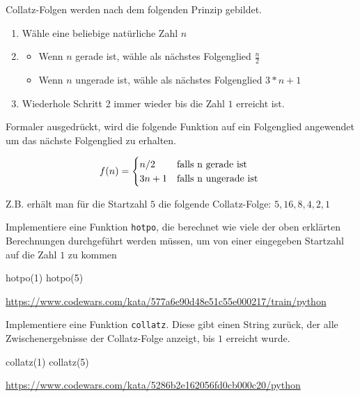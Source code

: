 \documentclass[class=scrartcl, crop=false]{standalone}
\begin{document}
\begin{aufgabe} \noindent
Collatz-Folgen werden nach dem folgenden Prinzip gebildet. 
\begin{enumerate}
	\item Wähle eine beliebige natürliche Zahl $n$
	\item  
		\begin{itemize}
		\item Wenn $n$ gerade ist, wähle als nächstes Folgenglied $\frac{n}{2}$
		\item Wenn $n$ ungerade ist, wähle als nächstes Folgenglied $3*n + 1$
		\end{itemize} 
	\item Wiederhole Schritt 2 immer wieder bis die Zahl $1$ erreicht ist.

\end{enumerate}

Formaler ausgedrückt, wird die folgende Funktion auf ein Folgenglied angewendet um das nächste Folgenglied zu erhalten.

$$f(n) = \begin{cases} n/2 &\textnormal{falls n gerade ist } \\ 3n+1 & \textnormal{falls n ungerade ist } \end{cases}$$


Z.B. erhält man für die Startzahl $5$ die folgende Collatz-Folge: $5, 16, 8, 4, 2, 1$

Implementiere eine Funktion \texttt{hotpo}, die berechnet wie viele der oben erklärten Berechnungen durchgeführt werden müssen, um von einer eingegeben Startzahl auf die Zahl $1$ zu kommen

\begin{pyconsole}
hotpo(1)
hotpo(5)
\end{pyconsole}

\noindent\url{https://www.codewars.com/kata/577a6e90d48e51c55e000217/train/python}
\end{aufgabe}



\begin{aufgabe} \noindent
Implementiere eine Funktion  \texttt{collatz}. Diese gibt einen String zurück, der alle Zwischenergebnisse der Collatz-Folge anzeigt, bis $1$ erreicht wurde.

\begin{pyconsole}
collatz(1)
collatz(5)
\end{pyconsole}
\noindent\url{https://www.codewars.com/kata/5286b2e162056fd0cb000c20/python}
\end{aufgabe}
\end{document}

